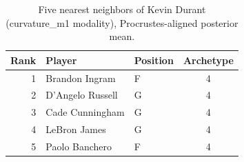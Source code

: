 \begin{table}[htbp]
  \centering\small
  \begin{tabular}{rllc}
    \toprule
    Rank & Player & Position & Archetype \\
    \midrule
    1 & Brandon Ingram & F & 4 \\
    2 & D'Angelo Russell & G & 4 \\
    3 & Cade Cunningham & G & 4 \\
    4 & LeBron James & G & 4 \\
    5 & Paolo Banchero & F & 4 \\
    \bottomrule
  \end{tabular}
  \caption{Five nearest neighbors of Kevin Durant (curvature_m1 modality), Procrustes-aligned posterior mean.}
  \label{tab:Kevin_Durant_neighbors_curvature_m1}
\end{table}

